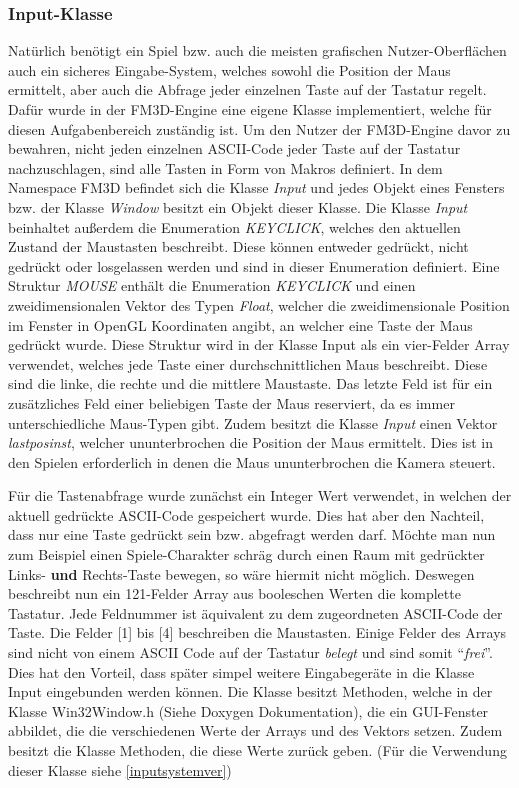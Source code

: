 \subsubsection{Input-Klasse}

Natürlich benötigt ein Spiel bzw. auch die meisten grafischen Nutzer-Oberflächen auch ein sicheres Eingabe-System, welches sowohl die Position der Maus ermittelt, aber auch die Abfrage jeder einzelnen Taste auf der Tastatur regelt. 
Dafür wurde in der FM3D-Engine eine eigene Klasse implementiert, welche für diesen Aufgabenbereich zuständig ist.
Um den Nutzer der FM3D-Engine davor zu bewahren, nicht jeden einzelnen ASCII-Code jeder Taste auf der Tastatur nachzuschlagen, sind alle Tasten in Form von Makros definiert. 
In dem Namespace FM3D befindet sich die Klasse \textit{Input} und jedes Objekt eines Fensters bzw. der Klasse \textit{Window} besitzt ein Objekt dieser Klasse. Die Klasse \textit{Input} beinhaltet außerdem die Enumeration \textit{KEYCLICK}, welches den aktuellen Zustand der Maustasten beschreibt. Diese können entweder gedrückt, nicht gedrückt oder losgelassen werden und sind in dieser Enumeration definiert.
Eine Struktur \textit{MOUSE} enthält die Enumeration \textit{KEYCLICK} und einen zweidimensionalen Vektor des Typen \textit{Float}, welcher die zweidimensionale Position im Fenster in OpenGL Koordinaten angibt, an welcher eine Taste der Maus gedrückt wurde.
Diese Struktur wird in der Klasse Input als ein vier-Felder Array verwendet, welches jede Taste einer durchschnittlichen Maus beschreibt. Diese sind die linke, die rechte und die mittlere Maustaste. Das letzte Feld ist für ein zusätzliches Feld einer beliebigen Taste der Maus reserviert, da es immer unterschiedliche Maus-Typen gibt.
Zudem besitzt die Klasse \textit{Input} einen Vektor \textit{lastposinst}, welcher ununterbrochen die Position der Maus ermittelt. Dies ist in den Spielen erforderlich in denen die Maus ununterbrochen die Kamera steuert.

Für die Tastenabfrage wurde zunächst ein Integer Wert verwendet, in welchen der aktuell gedrückte ASCII-Code gespeichert wurde. Dies hat aber den Nachteil, dass nur eine Taste gedrückt sein bzw. abgefragt werden darf. Möchte man nun zum Beispiel einen Spiele-Charakter schräg durch einen Raum mit gedrückter Links- \textbf{und} Rechts-Taste bewegen, so wäre hiermit nicht möglich. Deswegen beschreibt nun ein 121-Felder Array aus booleschen Werten die komplette Tastatur. Jede Feldnummer ist äquivalent zu dem zugeordneten ASCII-Code der Taste. Die Felder [1] bis [4] beschreiben die Maustasten. Einige Felder des Arrays sind nicht von einem ASCII Code auf der Tastatur \textit{belegt} und sind somit "`\textit{frei}"'. Dies hat den Vorteil, dass später simpel weitere Eingabegeräte in die Klasse Input eingebunden werden können.
Die Klasse besitzt Methoden, welche in der Klasse Win32Window.h (Siehe Doxygen Dokumentation), die ein GUI-Fenster abbildet, die die verschiedenen Werte der Arrays und des Vektors setzen.
Zudem besitzt die Klasse Methoden, die diese Werte zurück geben. (Für die Verwendung dieser Klasse siehe \cref{inputsystemver})